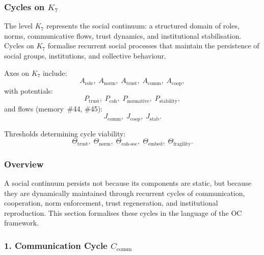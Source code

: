 
\subsubsection{Cycles on \texorpdfstring{$K_7$}{K_7}}
\label{sec:cycles-k7}

The level $K_7$ represents the social continuum: a structured domain of
roles, norms, communicative flows, trust dynamics, and institutional
stabilisation.  
Cycles on $K_7$ formalise recurrent social processes that maintain the
persistence of social groups, institutions, and collective behaviour.

Axes on $K_7$ include:
\[
  A_{\mathrm{role}},\;
  A_{\mathrm{norm}},\;
  A_{\mathrm{trust}},\;
  A_{\mathrm{comm}},\;
  A_{\mathrm{coop}},
\]
with potentials:
\[
  P_{\mathrm{trust}},\;
  P_{\mathrm{coh}},\;
  P_{\mathrm{normative}},\;
  P_{\mathrm{stability}},
\]
and flows (memory~\#44, \#45):
\[
  J_{\mathrm{comm}},\;
  J_{\mathrm{coop}},\;
  J_{\mathrm{stab}}.
\]

Thresholds determining cycle viability:
\[
  \Theta_{\mathrm{trust}},\;
  \Theta_{\mathrm{norm}},\;
  \Theta_{\mathrm{coh\text{-}soc}},\;
  \Theta_{\mathrm{embed}},\;
  \Theta_{\mathrm{fragility}}.
\]

\subsubsection{Overview}

A social continuum persists not because its components are static, but because
they are dynamically maintained through recurrent cycles of communication,
cooperation, norm enforcement, trust regeneration, and institutional
reproduction.  
This section formalises these cycles in the language of the OC framework.

\subsubsection{1. Communication Cycle $C_{\mathrm{comm}}$}

